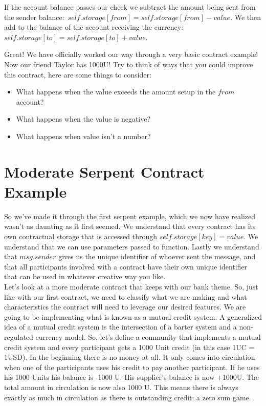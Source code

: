 \documentclass[12pt]{article}
\begin{document}
If the account balance passes our check we subtract the amount being sent from the sender balance: $self.storage[from] = self.storage[from] - value$. We then add to the balance of the account receiving the currency: $self.storage[to] = self.storage[to] + value$.

Great! We have officially worked our way through a very basic contract example! Now our friend Taylor has 1000U! Try to think of ways that you could improve this contract, here are some things to consider:

\begin{itemize}
\item What happens when the value exceeds the amount setup in the $from$ account?
\item What happens when the value is negative?
\item What happens when value isn't a number?
\end{itemize}

\cite{KenK's First Contract Tutorial}

\section{Moderate Serpent Contract Example}

	So we've made it through the first serpent example, which we now have realized wasn't as daunting as it first seemed. We understand that every contract has its own contractual storage that is accessed through $self.storage[key] = value$. We understand that we can use parameters passed to function. Lastly we understand that $msg.sender$ gives us the unique identifier of whoever sent the message, and that all participants involved with a contract have their own unique identifier that can be used in whatever creative way you like. \\

Let's look at a more moderate contract that keeps with our bank theme. So, just like with our first contract, we need to classify what we are making and what characteristics the contract will need to leverage our desired features. We are going to be implementing what is known as a mutual credit system. A generalized idea of a mutual credit system is the intersection of a barter system and a non-regulated currency model. So, let's define a community that implements a mutual credit system and every participant gets a 1000 Unit credit (in this case 1UC = 1USD). In the beginning there is no money at all. It only comes into circulation when one of the participants uses his credit to pay another participant. If he uses his 1000 Units his balance is -1000 U. His supplier's balance is now +1000U. The total amount in circulation is now also 1000 U. This means there is always exactly as much in circulation as there is outstanding credit: a zero sum game.
\end{document}
